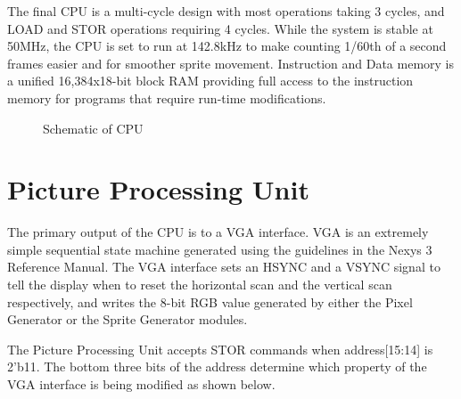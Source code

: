 \documentclass[letterpaper, 11 pt, conference]{article}
\begin{document}
The final CPU is a multi-cycle design with most operations taking 3 cycles, and LOAD and STOR operations requiring 4 cycles.  While the system is stable at 50MHz, the CPU is set to run at 142.8kHz to make counting 1/60th of a second frames easier and for smoother sprite movement.  Instruction and Data memory is a unified 16,384x18-bit block RAM providing full access to the instruction memory for programs that require run-time modifications.
\begin{center}
\begin{figure}
\caption{Schematic of CPU}
\label{fig:schematic}
\end{figure} 
\end{center} 



\section{Picture Processing Unit}

The primary output of the CPU is to a VGA interface.  VGA is an extremely simple sequential state machine generated using the guidelines in the Nexys 3 Reference Manual.  The VGA interface sets an HSYNC and a VSYNC signal to tell the display when to reset the horizontal scan and the vertical scan respectively, and writes the 8-bit RGB value generated by either the Pixel Generator or the Sprite Generator modules.

The Picture Processing Unit accepts STOR commands when address[15:14] is 2'b11.  The bottom three bits of the address determine which property of the VGA interface is being modified as shown below.
\end{document}
